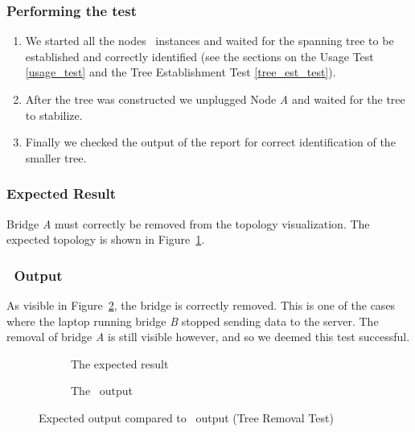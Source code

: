 \subsubsection*{Performing the test}
\begin{enumerate}
    \item We started all the nodes \tool\ instances and waited for the spanning tree to be established and correctly identified (see the sections on the Usage Test \ref{usage_test} and the Tree Establishment Test \ref{tree_est_test}).
    \item After the tree was constructed we unplugged Node \textit{A} and waited for the tree to stabilize.
    \item Finally we checked the output of the report for correct identification of the smaller tree.
\end{enumerate}

\subsubsection*{Expected Result}
Bridge \textit{A} must correctly be removed from the topology visualization.
The expected topology is shown in Figure~\ref{fig:removalExp}.

\subsubsection*{\tool\ Output}
As visible in Figure~\ref{fig:removal}, the bridge is correctly removed.
This is one of the cases where the laptop running bridge \textit{B} stopped sending data to the server.
The removal of bridge \textit{A} is still visible however, and so we deemed this test successful.

\begin{figure}[h]
    \begin{subfigure}[b]{\textwidth}
        \centering
        \caption{The expected result}
        \label{fig:removalExp}
    \end{subfigure}

    \vspace{0.5cm}

    \begin{subfigure}[b]{\textwidth}
        \centering
        
        \caption{The \tool\ output}
    \end{subfigure}
    \caption{Expected output compared to \tool\ output (Tree Removal Test)}
    \label{fig:removal}
\end{figure}

